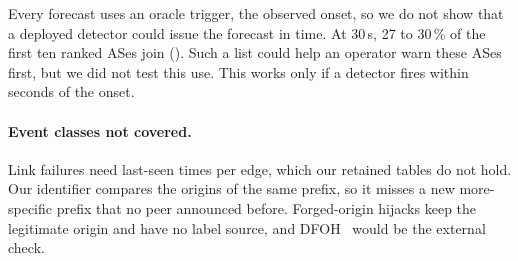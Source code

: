 Every forecast uses an oracle trigger, the observed onset, so we do not show that a deployed detector could issue the forecast in time.
At 30\,s, 27 to 30\,\% of the first ten ranked ASes join ().
Such a list could help an operator warn these ASes first, but we did not test this use.
This works only if a detector fires within seconds of the onset.

\paragraph{Event classes not covered.}
Link failures need last-seen times per edge, which our retained tables do not hold.
Our identifier compares the origins of the same prefix, so it misses a new more-specific prefix that no peer announced before.
Forged-origin hijacks keep the legitimate origin and have no label source, and DFOH~\cite{holterbach2024dfoh} would be the external check.
